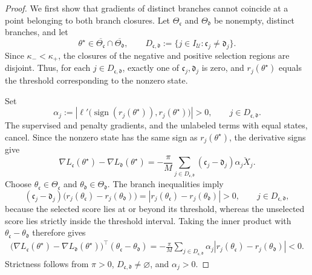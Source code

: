 \begin{proof}
We first show that gradients of distinct branches cannot coincide
at a point belonging to both branch closures.
Let $\Theta_{\mathfrak c}$ and $\Theta_{\mathfrak d}$ be nonempty,
distinct branches, and let
\[
    \theta^\star\in
        \overline{\Theta_{\mathfrak c}}
        \cap\overline{\Theta_{\mathfrak d}},
    \qquad
    D_{\mathfrak c,\mathfrak d}
    :=
    \{j\in I_{\mathcal U}:\mathfrak c_j\neq\mathfrak d_j\}.
\]
Since $\kappa_-<\kappa_+$, the closures of the negative and positive
selection regions are disjoint.
Thus, for each $j\in D_{\mathfrak c,\mathfrak d}$, exactly one of
$\mathfrak c_j,\mathfrak d_j$ is zero, and $r_j(\theta^\star)$
equals the threshold corresponding to the nonzero state.

Set
\[
    \alpha_j
    :=
    \left|
        \ell'\bigl(
            \operatorname{sign}(r_j(\theta^\star)),
            r_j(\theta^\star)
        \bigr)
    \right|
    >0,
    \qquad j\in D_{\mathfrak c,\mathfrak d}.
\]
The supervised and penalty gradients, and the unlabeled terms
with equal states, cancel. Since the nonzero state has the same
sign as $r_j(\theta^\star)$, the derivative signs give
\[
    \nabla L_{\mathfrak c}(\theta^\star)
    -
    \nabla L_{\mathfrak d}(\theta^\star)
    =
    -\frac{\pi}{M}
    \sum_{j\in D_{\mathfrak c,\mathfrak d}}
        (\mathfrak c_j-\mathfrak d_j)\alpha_j\breve X_j.
\]
Choose $\theta_{\mathfrak c}\in\Theta_{\mathfrak c}$ and
$\theta_{\mathfrak d}\in\Theta_{\mathfrak d}$.
The branch inequalities imply
\[
    (\mathfrak c_j-\mathfrak d_j)
    \bigl(
        r_j(\theta_{\mathfrak c})
        -
        r_j(\theta_{\mathfrak d})
    \bigr)
    =
    |r_j(\theta_{\mathfrak c})-r_j(\theta_{\mathfrak d})|
    >0,
    \qquad j\in D_{\mathfrak c,\mathfrak d},
\]
because the selected score lies at or beyond its threshold,
whereas the unselected score lies strictly inside the threshold
interval.
Taking the inner product with
$\theta_{\mathfrak c}-\theta_{\mathfrak d}$ therefore gives
\begin{equation}
\begin{aligned}
    \bigl(
        \nabla L_{\mathfrak c}(\theta^\star)
        -
        \nabla L_{\mathfrak d}(\theta^\star)
    \bigr)^\top
    (\theta_{\mathfrak c}-\theta_{\mathfrak d})
    =
    -\frac{\pi}{M}
    \sum_{j\in D_{\mathfrak c,\mathfrak d}}
        \alpha_j
        |r_j(\theta_{\mathfrak c})-r_j(\theta_{\mathfrak d})|
    <0.
\end{aligned}
    \label{eq:st-branch-gradient-separation}
\end{equation}
Strictness follows from $\pi>0$,
$D_{\mathfrak c,\mathfrak d}\neq\varnothing$, and $\alpha_j>0$.


\end{proof}
